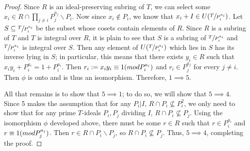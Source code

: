 \documentclass[10pt,a4paper]{amsart}
\newcommand{\modulo}[1]{\textup{ (mod }#1)}
\newcommand{\quot}[2]{\large\sfrac{#1}{#2}\normalsize}
\begin{document}
\begin{proof}
		Since $R$ is an ideal-preserving subring of $T$, we can select some $x_i\in R\cap \prod_{j\neq i}P_j^{a_j}\backslash P_i$. Now since $x_i\notin P_i$, we know that $x_i+I\in U(\sfrac{T}{P_i^{a_i}})$. Let $S\subseteq \quot{T}{P_i^{a_i}}$ be the subset whose cosets contain elements of $R$. Since $R$ is a subring of $T$ and $T$ is integral over $R$, it is plain to see that $S$ is a subring of $\quot{T}{P_i^{a_i}}$ and $\quot{T}{P_i^{a_i}}$ is integral over $S$. Then any element of $U(\sfrac{T}{P_i^{a_i}})$ which lies in $S$ has its inverse lying in $S$; in particular, this means that there exists $y_i\in R$ such that $x_iy_i+P_i^{a_i}=1+P_i^{a_i}$. Then $r_i:=x_iy_i\equiv 1\modulo{P_i^{a_i}}$ and $r_i\in P_j^{a_j}$ for every $j\neq i$. Then $\phi$ is onto and is thus an isomorphism. Therefore, $1\implies 5$.
		
		All that remains is to show that $5\implies 1$; to do so, we will show that $5\implies 4$. Since 5 makes the assumption that for any $P_i|I$, $R\cap P_i\nsubseteq P_i^2$, we only need to show that for any prime $T$-ideals $P_i,P_j$ dividing $I$, $R\cap P_i\nsubseteq P_j$. Using the isomorphism $\phi$ developed above, there must be some $r\in R$ such that $r\in P_i^{a_i}$ and $r\equiv 1\modulo{P_j^{a_j}}$. Then $r\in R\cap P_i\backslash P_j$, so $R\cap P_i\nsubseteq P_j$. Thus, $5\implies 4$, completing the proof. 
	\end{proof}
\end{document}
